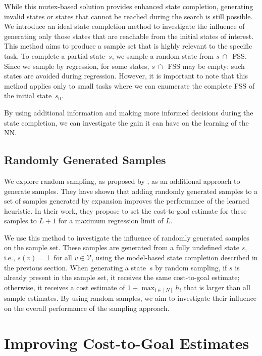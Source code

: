 While this mutex-based solution provides enhanced state completion, generating invalid states or states that cannot be reached during the search is still possible. We introduce an ideal state completion method to investigate the influence of generating only those states that are reachable from the initial states of interest. This method aims to produce a sample set that is highly relevant to the specific task. To complete a partial state~$s$, we sample a random state from $s~\cap$~FSS. Since we sample by regression, for some states, $s~\cap$~FSS may be empty; such states are avoided during regression. However, it is important to note that this method applies only to small tasks where we can enumerate the complete FSS of the initial state~$s_0$.

By using additional information and making more informed decisions during the state completion, we can investigate the gain it can have on the learning of the NN.

\subsection{Randomly Generated Samples}
\label{sec:random-samples}

We explore random sampling, as proposed by \citet{otoole2022sampling}, as an additional approach to generate samples. They have shown that adding randomly generated samples to a set of samples generated by expansion improves the performance of the learned heuristic. In their work, they propose to set the cost-to-goal estimate for these samples to $L+1$ for a maximum regression limit of $L$.

We use this method to investigate the influence of randomly generated samples on the sample set. These samples are generated from a fully undefined state $s$, i.e., $s(v) = \bot$ for all $v \in \mathcal{V}$, using the model-based state completion described in the previous section. When generating a state~$s$ by random sampling, if $s$ is already present in the sample set, it receives the same cost-to-goal estimate; otherwise, it receives a cost estimate of $1+\max_{i\in[N]} h_i$ that is larger than all sample estimates. By using random samples, we aim to investigate their influence on the overall performance of the sampling approach.

\section{Improving Cost-to-Goal Estimates}
\label{sec:cost-to-goal-estimates}

